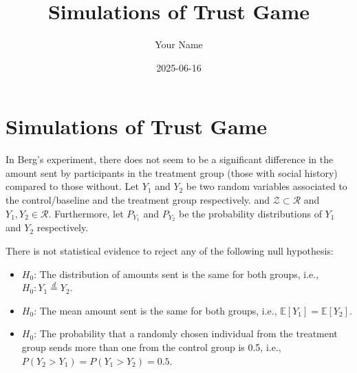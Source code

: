 \documentclass[
]{article}
\title{Simulations of Trust Game}
\author{Your Name}
\date{2025-06-16}
\providecommand{\tightlist}{%
  \setlength{\itemsep}{0pt}\setlength{\parskip}{0pt}}
\begin{document}
\maketitle

\section{Simulations of Trust Game}\label{simulations-of-trust-game}

In Berg's experiment, there does not seem to be a significant difference
in the amount sent by participants in the treatment group (those with
social history) compared to those without. Let \(Y_{1}\) and \(Y_{2}\)
be two random variables associated to the control/baseline and the
treatment group respectively. and \(\mathcal{Z} \subset  \mathcal{R}\)
and \(Y_{1}, Y_{2} \in \mathcal{R}\). Furthermore, let \(P_{Y_{1}}\) and
\(P_{Y_{2}}\) be the probability distributions of \(Y_{1}\) and
\(Y_{2}\) respectively.

There is not statistical evidence to reject any of the following null
hypothesis:

\begin{itemize}
\tightlist
\item
  \(H_0\): The distribution of amounts sent is the same for both groups,
  i.e., \(H_{0}: Y_1 \overset{d}{=} Y_{2}\).
\item
  \(H_0\): The mean amount sent is the same for both groups, i.e.,
  \(\mathbb{E}[Y_{1}] = \mathbb{E}[Y_{2}]\).
\item
  \(H_0\): The probability that a randomly chosen individual from the
  treatment group sends more than one from the control group is 0.5,
  i.e., \(P(Y_{2} > Y_{1}) = P(Y_{1} > Y_{2}) = 0.5\).
\end{itemize}
\end{document}
